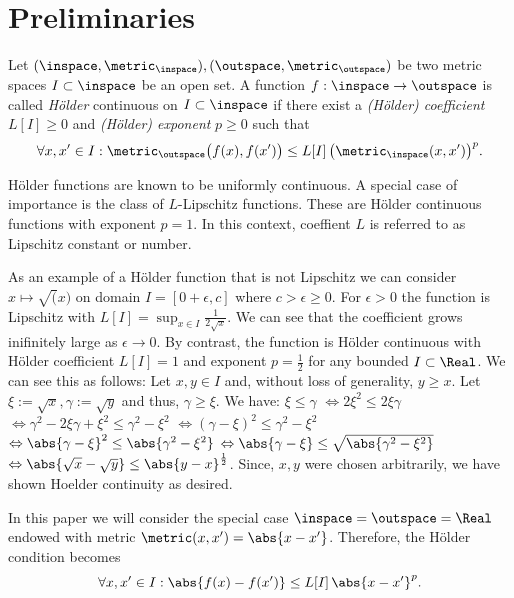 \section{Preliminaries}

\begin{defn} 
Let $(\inspace ,\metric_\inspace ), (\outspace , \metric_\outspace )$ be two metric spaces
$I \subset \inspace$ be an open set. A function $f: \inspace \to \outspace $ is called \emph{H\"older} 
continuous on $I \subset \inspace$ if there exist a \emph{(H\"older) coefficient} $L[I] \geq 0$ and \emph{(H\"older) 
exponent} $p\geq 0$ such that 
\[\forall x,x' \in I : \metric_\outspace \bigl(f(x),f(x')\bigr) \leq L[I] \, \bigl( \metric_\inspace (x,x') \bigr)^p. \]
 \end{defn}
H\"older functions are known to be uniformly continuous. 
A special case of importance is the class of $L$-Lipschitz functions. These are H\"older continuous 
functions with exponent $p=1$. In this context, coeffient $L$ is referred to as Lipschitz constant or number.

\begin{ex}\label{ex:sqrtfctHoelder}
As an example of a H\"older function that is not Lipschitz we can consider $x \mapsto \sqrt(x)$ on domain $I = [0+\epsilon,c]$ where 
$c >\epsilon \geq 0 $. For $\epsilon >0 $ the function is Lipschitz with $L[I] = \sup_{x \in I} \frac{1} {2 \sqrt{x}}$. We can see that the 
coefficient grows inifinitely large as $\epsilon \to 0$. By contrast, the function is H\"older continuous 
with H\"older coefficient $L[I]=1$ and exponent $p=\frac 1 2 $ for any bounded $I \subset \Real$.
We can see this as follows: Let $x,y \in I$ and, without loss of generality,  $y \geq x$. Let $\xi := \sqrt{x}, \gamma := \sqrt{y}$ and thus, $\gamma \geq \xi$. We have:
$\xi \leq \gamma $ $\Leftrightarrow 2 \xi^2 \leq 2\xi\gamma$ $\Leftrightarrow \gamma^2 - 2 \xi\gamma + \xi^2  \leq \gamma^2 - \xi^2$ $\Leftrightarrow (\gamma-\xi)^2  \leq \gamma^2-\xi^2$ $\Leftrightarrow \abs{\gamma-\xi}^2  \leq \abs{\gamma^2-\xi^2}$
 $\Leftrightarrow \abs{\gamma-\xi}  \leq \sqrt{\abs{\gamma^2-\xi^2}}$  $\Leftrightarrow \abs{\sqrt{x}-\sqrt{y}}  \leq \abs{y-x}^{\frac{1}{2}}$. Since, $x,y$ were chosen arbitrarily, we have shown Hoelder continuity as desired.
\end{ex}
 
 In this paper we will consider the special case  $\inspace = \outspace = \Real$ endowed with metric 
 $\metric(x,x') = \abs{x-x'}$.
 Therefore, the H\"older condition becomes 
 \[\forall x,x' \in I : \abs{f(x)-f(x')} \leq L[I] \, \abs{x-x'}^p. \]


